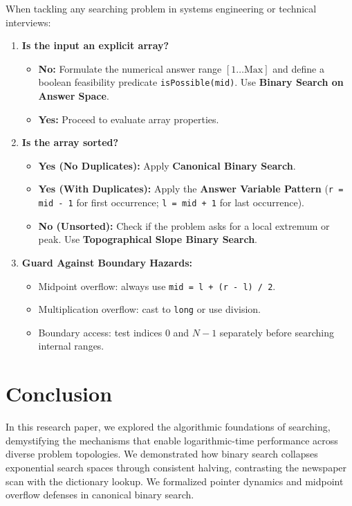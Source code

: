 \documentclass[10pt,journal,compsoc,onecolumn]{IEEEtran}
\begin{document}
When tackling any searching problem in systems engineering or technical interviews:
\begin{enumerate}
    \item \textbf{Is the input an explicit array?}
    \begin{itemize}
        \item \textbf{No:} Formulate the numerical answer range $[1 \dots \text{Max}]$ and define a boolean feasibility predicate \texttt{isPossible(mid)}. Use \textbf{Binary Search on Answer Space}.
        \item \textbf{Yes:} Proceed to evaluate array properties.
    \end{itemize}
    \item \textbf{Is the array sorted?}
    \begin{itemize}
        \item \textbf{Yes (No Duplicates):} Apply \textbf{Canonical Binary Search}.
        \item \textbf{Yes (With Duplicates):} Apply the \textbf{Answer Variable Pattern} (\texttt{r = mid - 1} for first occurrence; \texttt{l = mid + 1} for last occurrence).
        \item \textbf{No (Unsorted):} Check if the problem asks for a local extremum or peak. Use \textbf{Topographical Slope Binary Search}.
    \end{itemize}
    \item \textbf{Guard Against Boundary Hazards:}
    \begin{itemize}
        \item Midpoint overflow: always use \texttt{mid = l + (r - l) / 2}.
        \item Multiplication overflow: cast to \texttt{long} or use division.
        \item Boundary access: test indices $0$ and $N - 1$ separately before searching internal ranges.
    \end{itemize}
\end{enumerate}

\section{Conclusion}
\label{sec:conclusion}

In this research paper, we explored the algorithmic foundations of searching, demystifying the mechanisms that enable logarithmic-time performance across diverse problem topologies. We demonstrated how binary search collapses exponential search spaces through consistent halving, contrasting the newspaper scan with the dictionary lookup. We formalized pointer dynamics and midpoint overflow defenses in canonical binary search.
\end{document}
